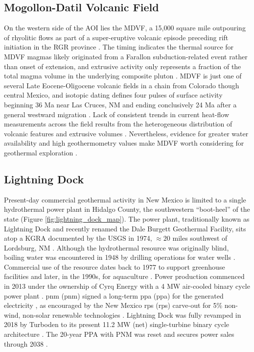 \subsection{Mogollon-Datil Volcanic Field}\label{ch2:mdvf_province}

On the western side of the AOI lies the MDVF, a 15,000 square mile outpouring of rhyolitic flows as part of a super-eruptive volcanic episode preceding rift initiation in the RGR province \citep{keller_rio_1999}. The timing indicates the thermal source for MDVF magmas likely originated from a Farallon subduction-related event rather than onset of extension, and extrusive activity only represents a fraction of the total magma volume in the underlying composite pluton \citep{olsen_rio_1987,schneider_crustal_1994}. MDVF is just one of several Late Eocene-Oligocene volcanic fields in a chain from Colorado though central Mexico, and isotopic dating defines four pulses of surface activity beginning 36 Ma near Las Cruces, NM and ending conclusively 24 Ma after a general westward migration \citep{mcintosh_time-stratigraphic_1992}. Lack of consistent trends in current heat-flow measurements across the field results from the heterogeneous distribution of volcanic features and extrusive volumes \citep{mcintosh_time-stratigraphic_1992}. Nevertheless, evidence for greater water availability and high geothermometry values make MDVF worth considering for geothermal exploration \citep{pepin_new_2019}.

\subsection{Lightning Dock}\label{ch2:lightning_dock}

Present-day commercial geothermal activity in New Mexico is limited to a single hydrothermal power plant in Hidalgo County, the southwestern ``boot-heel'' of the state (Figure \ref{fig:lightning_dock_map}). The power plant, traditionally known as Lightning Dock and recently renamed the Dale Burgett Geothermal Facility, sits atop a KGRA documented by the USGS in 1974, $\approx20$ miles southwest of Lordsburg, NM \citep{dahal_evaluation_2012}. Although the hydrothermal resource was originally blind, boiling water was encountered in 1948 by drilling operations for water wells \citep{elston_geology_1983}. Commercial use of the resource dates back to 1977 to support greenhouse facilities and later, in the 1990s, for aquaculture \citep{crowell_history_2014}. Power production commenced in 2013 under the ownership of Cyrq Energy with a 4 MW air-cooled binary cycle power plant \citep{goodman_lightning_2013}. \acrlong{pnm} (\acrshort{pnm}) signed a long-term \acrlong{ppa} (\acrshort{ppa}) for the generated electricity \citep{dahal_evaluation_2012}, as encouraged by the New Mexico \acrlong{rps} (\acrshort{rps}) carve-out for 5\% non-wind, non-solar renewable technologies \citep{dsire_dsire_2021}. Lightning Dock was fully revamped in 2018 by Turboden to its present 11.2 MW (net) single-turbine binary cycle architecture \citep{bonafin_repowering_2019}. The 20-year PPA with PNM was reset and secures power sales through 2038 \citep{oconnell_matter_2018}.

